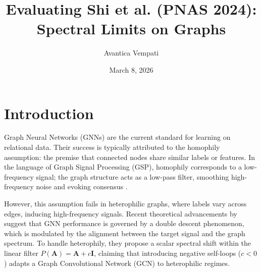 \documentclass[10pt]{article}
\title{\large Evaluating Shi et al. (PNAS 2024):\\ Spectral Limits on Graphs}
\author{\large Avantica Vempati}
\date{\large March 8, 2026}
\begin{document}
\maketitle





\section{Introduction}

Graph Neural Networks (GNNs) are the current standard for learning on relational data.
Their success is typically attributed to the homophily assumption: the premise that connected nodes share similar labels or features.
In the language of Graph Signal Processing (GSP), homophily corresponds to a low-frequency signal; the graph structure acts as a low-pass filter, smoothing high-frequency noise and evoking consensus \parencite{wu2019}.

However, this assumption fails in heterophilic graphs, where labels vary across edges, inducing high-frequency signals.
Recent theoretical advancements by \textcite{shi2024} suggest that GNN performance is governed by a double descent phenomenon, which is modulated by the alignment between the target signal and the graph spectrum.
To handle heterophily, they propose a scalar spectral shift within the linear filter $P(\mathbf{A}) = \mathbf{A} + c\mathbf{I}$, claiming that introducing negative self-loops ($c < 0$) adapts a Graph Convolutional Network (GCN) to heterophilic regimes.
\end{document}
